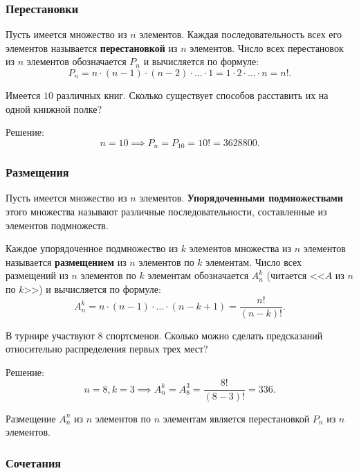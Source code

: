 \subsubsection{Перестановки}

Пусть имеется множество из \(n\) элементов. Каждая последовательность всех его элементов называется \textbf{перестановкой} из \(n\) элементов. Число всех перестановок из \(n\) элементов обозначается \(P_n\) и вычисляется по формуле:
\[
    P_n = n \cdot (n - 1) \cdot (n - 2) \cdot \ldots \cdot 1 = 1 \cdot 2 \cdot \ldots \cdot n = n!.
\]

\begin{example*}
    Имеется \(10\) различных книг. Сколько существует способов расставить их на одной книжной полке?

    Решение:
    \[
        n = 10
        \implies
        P_n = P_{10} = 10! = 3628800.
    \]
\end{example*}

\subsubsection{Размещения}

Пусть имеется множество из \(n\) элементов. \textbf{Упорядоченными подмножествами} этого множества называют различные последовательности, составленные из элементов подмножеств.

Каждое упорядоченное подмножество из \(k\) элементов множества из \(n\) элементов называется \textbf{размещением} из \(n\) элементов по \(k\) элементам. Число всех размещений из \(n\) элементов по \(k\) элементам обозначается \(A_n^k\) (читается <<\(A\) из \(n\) по \(k\)>>) и вычисляется по формуле:
\[
    A_n^k = n \cdot (n - 1) \cdot \ldots \cdot (n - k + 1) = \frac{n!}{(n - k)!}.
\]

\begin{example*}
    В турнире участвуют \(8\) спортсменов. Сколько можно сделать предсказаний относительно распределения первых трех мест?

    Решение:
    \[
        n = 8, k = 3
        \implies
        A_n^k = A_8^3 =
        \frac{8!}{(8 - 3)!} = 336.
    \]
\end{example*}

\begin{note*}
    Размещение \(A_n^n\) из \(n\) элементов по \(n\) элементам является перестановкой \(P_n\) из \(n\) элементов.
\end{note*}

\subsubsection{Сочетания}

